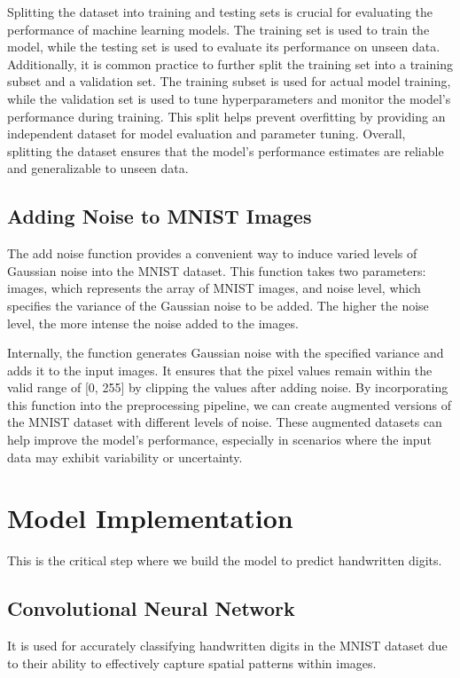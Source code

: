 Splitting the dataset into training and testing sets is crucial for evaluating the performance of machine learning models. The training set is used to train the model, while the testing set is used to evaluate its performance on unseen data. Additionally, it is common practice to further split the training set into a training subset and a validation set. The training subset is used for actual model training, while the validation set is used to tune hyperparameters and monitor the model's performance during training. This split helps prevent overfitting by providing an independent dataset for model evaluation and parameter tuning. Overall, splitting the dataset ensures that the model's performance estimates are reliable and generalizable to unseen data.


\subsection{Adding Noise to MNIST Images}

The add noise function provides a convenient way to induce varied levels of Gaussian noise into the MNIST dataset. This function takes two parameters: images, which represents the array of MNIST images, and noise level, which specifies the variance of the Gaussian noise to be added. The higher the noise level, the more intense the noise added to the images.

Internally, the function generates Gaussian noise with the specified variance and adds it to the input images. It ensures that the pixel values remain within the valid range of [0, 255] by clipping the values after adding noise.
By incorporating this function into the preprocessing pipeline, we can create augmented versions of the MNIST dataset with different levels of noise. These augmented datasets can help improve the model's performance, especially in scenarios where the input data may exhibit variability or uncertainty.

\section{Model Implementation}
This is the critical step where we build the model to predict handwritten digits.

\subsection{Convolutional Neural Network}

It is used for accurately classifying handwritten digits in the MNIST dataset due to their ability to effectively capture spatial patterns within images.

